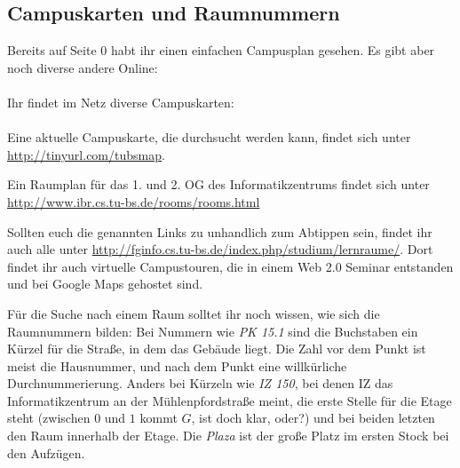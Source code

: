 \subsection{Campuskarten und Raumnummern}
\label{campuskarte}
\ifpdf %
Bereits auf Seite 0 habt ihr einen einfachen Campusplan
gesehen. Es gibt aber noch diverse andere Online:\\\\
\else
Ihr findet im Netz diverse Campuskarten:\\\\
\fi
Eine aktuelle Campuskarte, die durchsucht werden kann, findet sich unter \url{http://tinyurl.com/tubsmap}.

Ein Raumplan für das 1. und 2. OG des Informatikzentrums findet sich
unter \url{http://www.ibr.cs.tu-bs.de/rooms/rooms.html}

Sollten euch die genannten Links zu unhandlich zum Abtippen sein, findet ihr
auch alle unter \url{http://fginfo.cs.tu-bs.de/index.php/studium/lernraume/}.
Dort findet ihr auch virtuelle Campustouren, die  in einem Web 2.0 Seminar entstanden und
bei Google Maps gehostet sind.

Für die Suche nach einem Raum solltet ihr noch wissen, wie sich die Raumnummern bilden: Bei Nummern wie \textit{PK 15.1} sind die Buchstaben ein Kürzel für die Straße, in dem das Gebäude liegt. Die Zahl vor dem Punkt ist meist die Hausnummer, und nach dem Punkt eine willkürliche Durchnummerierung. Anders bei Kürzeln wie \textit{IZ 150}, bei denen IZ das Informatikzentrum an der Mühlenpfordstraße meint, die erste Stelle für die Etage steht (zwischen $0$ und $1$ kommt $G$, ist doch klar, oder?) und bei beiden letzten den Raum innerhalb der Etage. Die \textit{Plaza} ist der große Platz im ersten Stock bei den Aufzügen.
